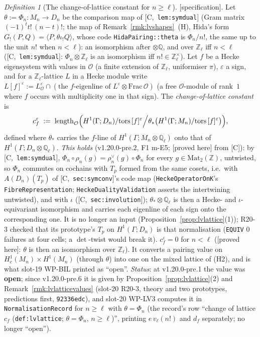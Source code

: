 \documentclass[11pt]{article}
\theoremstyle{remark}
\newtheorem{definition}[theorem]{Definition}
\newcommand{\Z}{\mathbb{Z}}
\newcommand{\Q}{\mathbb{Q}}
\newcommand{\Ga}{\Gamma}
\newcommand{\Mn}{M_n}
\newcommand{\Dn}{D_n}
\newcommand{\HA}[1]{[C,~\texttt{#1}]}      %
\newcommand{\PROVED}{\textsf{[proved here]}}
\newcommand{\SPEC}{\textsf{[specification]}}           %
\begin{document}
\begin{definition}[The change-of-lattice constant for $n\ge\ell$]\label{def:lvlattice}
\SPEC. Let $\theta:=\Phi_n\colon\Mn\to\Dn$ be the comparison map of \HA{lem:symdual} (Gram matrix $(-1)^{t}t!\,(n-t)!$; the map of Remark~\ref{rmk:lvshapes}~(H), Hida's form
$G_{!}(P,Q)=\langle P,\theta\iota_{!}Q\rangle$, whose code \texttt{HidaPairing::theta} is $\Phi_n/n!$, the same up to the unit $n!$ when $n<\ell$): an isomorphism after $\otimes\Q$, and over
$\Z_\ell$ iff $n<\ell$ (\HA{lem:symdual}: $\Phi_n\otimes\Z_\ell$ is an isomorphism iff $n!\in\Z_\ell^{\times}$). Let $f$ be a Hecke eigensystem with values in $\mathcal O$ (a finite extension of $\Z_\ell$, uniformiser $\pi$), $\varepsilon$ a sign, and for
a $\Z_\ell$-lattice $L$ in a Hecke module write $L[f]^{\varepsilon}:=L_{\mathcal O}^{\varepsilon}\cap(\text{the }f\text{-eigenline of }L^{\varepsilon}\otimes\mathrm{Frac}\,\mathcal O)$ (a free
$\mathcal O$-module of rank~$1$ where $f$ occurs with multiplicity one in that sign). The \emph{change-of-lattice constant} is
\[
  c^{\varepsilon}_f\;:=\;\mathrm{length}_{\mathcal O}\Bigl(H^{1}(\Ga;\Dn)/\mathrm{tors}\,[f]^{\varepsilon}\Big/\theta_\ast\bigl(H^{1}(\Ga;\Mn)/\mathrm{tors}\,[f]^{\varepsilon}\bigr)\Bigr),
\]
defined where $\theta_\ast$ carries the $f$-line of $H^{1}(\Ga;\Mn\otimes\Q_\ell)$ onto that of $H^{1}(\Ga;\Dn\otimes\Q_\ell)$. \emph{This holds} (v1.20.0-pre.2, F1 m-E5; \PROVED{} from [C]):
by \HA{lem:symdual}, $\Phi_n\circ\rho_n(g)=\rho_n^{\vee}(g)\circ\Phi_n$ for every $g\in\mathrm{Mat}_2(\Z)$, untwisted, so $\Phi_n$ commutes on cochains with $T_p$ formed from the same cosets,
i.e.\ with $A(\Dn)(T_p)$ of \HA{sec:symconv}'s code map (\texttt{HeckeOperatorOnK}'s \texttt{FibreRepresentation}; \texttt{HeckeDualityValidation} asserts the intertwining
untwisted), and with $\iota$ (\HA{sec:involution}); $\theta_\ast\otimes\Q_\ell$ is then a Hecke- and $\iota$-equivariant isomorphism and carries each eigenline of each sign onto the
corresponding one. It is no longer an input (Proposition~\ref{prop:lvlattice}(1)); R20-3 checked that its prototype's $T_p$ on $H^{1}(\Ga;\Dn)$ is that normalisation (\texttt{EQUIV} $0$ failures at four cells; a $\det$-twist would break it). $c^{\varepsilon}_f=0$ for $n<\ell$ (\PROVED: $\theta$ is then an isomorphism over $\Z_\ell$). It converts a pairing value on $H^{1}_c(\Mn)\times H^{1}(\Mn)$ (through $\theta$)
into one on the mixed lattice of (H2), and is what slot-19 WP-BIL printed as ``open''. \emph{Status}: at v1.20.0-pre.1 the value was \textbf{open}; since v1.20.0-pre.6 it is given by Proposition~\ref{prop:lvlattice}(2) and Remark~\ref{rmk:lvlatticevalues} (slot-20 R20-3,
theory and two prototypes, predictions first, \texttt{92336edc}), and slot-20 WP-LV3 computes it in \texttt{NormalisationRecord} for $n\ge\ell$ with $\theta=\Phi_n$ (the record's row ``change of
lattice $c_f$ (\texttt{def:lvlattice}; $\theta=\Phi_n$, $n\ge\ell$)'', printing $e\,v_\ell(n!)$ and $d_f$ separately; no longer ``open'').
\end{definition}
\end{document}
